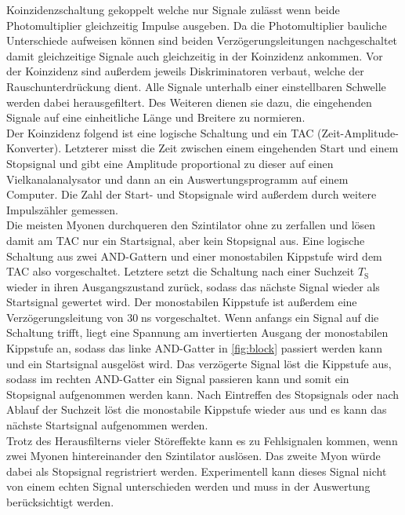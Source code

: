 Koinzidenzschaltung gekoppelt welche nur Signale zulässt wenn beide Photomultiplier gleichzeitig Impulse 
ausgeben. Da die Photomultiplier bauliche Unterschiede aufweisen können sind beiden Verzögerungsleitungen 
nachgeschaltet damit gleichzeitige Signale auch gleichzeitig in der Koinzidenz ankommen.
Vor der Koinzidenz sind außerdem jeweils Diskriminatoren verbaut, welche der Rauschunterdrückung dient. 
Alle Signale unterhalb einer einstellbaren Schwelle werden dabei herausgefiltert. 
Des Weiteren dienen sie dazu, die eingehenden Signale auf eine einheitliche Länge und Breitere zu normieren.\\
Der Koinzidenz folgend ist eine logische Schaltung und ein TAC (Zeit-Amplitude-Konverter). Letzterer misst die 
Zeit zwischen einem eingehenden Start und einem Stopsignal und gibt eine Amplitude proportional 
zu dieser auf einen Vielkanalanalysator und dann an ein Auswertungsprogramm auf einem Computer.
Die Zahl der Start- und Stopsignale wird außerdem durch weitere Impulszähler gemessen. \\
Die meisten Myonen durchqueren den Szintilator ohne zu zerfallen und lösen damit am TAC nur ein Startsignal, 
aber kein Stopsignal aus. Eine logische Schaltung aus zwei AND-Gattern und einer monostabilen Kippstufe wird dem TAC 
also vorgeschaltet. Letztere setzt die Schaltung nach einer Suchzeit $T_{\text{S}}$ wieder in ihren 
Ausgangszustand zurück, sodass das nächste Signal wieder als Startsignal gewertet wird.
Der monostabilen Kippstufe ist außerdem eine Verzögerungsleitung von $30\;$ns vorgeschaltet.
Wenn anfangs ein Signal auf die Schaltung trifft, liegt eine Spannung am invertierten Ausgang der monostabilen Kippstufe an,
sodass das linke AND-Gatter in \autoref{fig:block} passiert werden kann und ein Startsignal ausgelöst wird. Das verzögerte Signal löst 
die Kippstufe aus, sodass im rechten AND-Gatter ein Signal passieren kann und somit ein Stopsignal aufgenommen werden kann.
Nach Eintreffen des Stopsignals oder nach Ablauf der Suchzeit löst die monostabile Kippstufe wieder aus und 
es kann das nächste Startsignal aufgenommen werden. \\
Trotz des Herausfilterns vieler Störeffekte kann es zu Fehlsignalen kommen, wenn zwei Myonen hintereinander 
den Szintilator auslösen. Das zweite Myon würde dabei als Stopsignal regristriert werden. Experimentell kann 
dieses Signal nicht von einem echten Signal unterschieden werden und muss in der Auswertung berücksichtigt werden.

